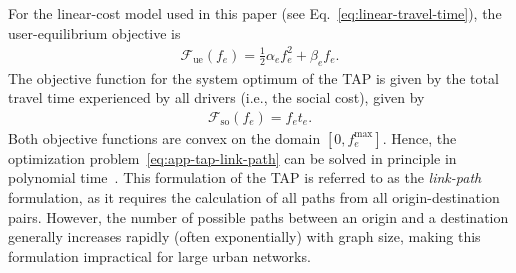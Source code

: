\documentclass[twocolumn,english,groupedaddress, superscriptaddress,aps,pre,10pt,floatfix]{revtex4-2}
\begin{document}
For the linear-cost model used in this paper (see Eq.~\ref{eq:linear-travel-time}), the user-equilibrium objective is
\begin{align}
    \mathcal{F}_{\text{ue}}(f_e)=\frac{1}{2}\alpha_e f_e^2+\beta_e f_e.
\end{align}
The objective function for the system optimum of the TAP is given by the total travel time experienced by all drivers (i.e., the social cost), given by
 \begin{align}
     \mathcal{F}_{\text{so}}(f_e) = f_e t_e.
 \end{align}
Both objective functions are convex on the domain $[0, f_e^{\max}]$. Hence, the optimization problem~\eqref{eq:app-tap-link-path} can be solved in principle in polynomial time~\citep{kozlov1979polynomial}.
This formulation of the TAP is referred to as the \textit{link-path} formulation, as it requires the calculation of all paths from all origin-destination pairs. However, the number of possible paths between an origin and a destination generally increases rapidly (often exponentially) with graph size, making this formulation impractical for large urban networks.\\
\end{document}
